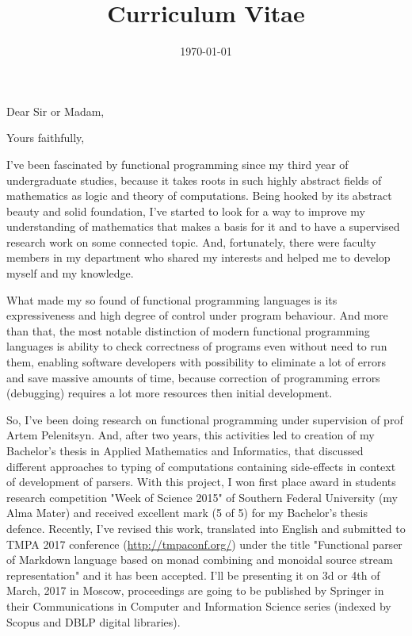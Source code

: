 \documentclass[11pt,a4paper,sans]{moderncv} %
\title{Curriculum Vitae}
\begin{document}


\clearpage

\date{\today} %
\opening{Dear Sir or Madam,} %
\closing{Yours faithfully,} %

\makelettertitle %

\justify
I've been fascinated by functional programming since my third year of
undergraduate studies, because it takes roots in such highly
abstract fields of mathematics as logic and theory of computations. Being hooked 
by its abstract beauty and solid foundation,
I've started to look for a way to improve my understanding of mathematics that 
makes a basis for it and to have a supervised research work on some connected 
topic. And, fortunately, there were faculty members in my department who shared 
my interests and helped me to develop myself and my knowledge.

What made my so found of functional programming languages is its expressiveness
and high degree of control under program behaviour. And more than that,
the most notable distinction of modern functional programming languages is
ability to check correctness of programs even without need to run them,
enabling software developers with possibility to eliminate a lot of errors and
save massive amounts of time, because correction of programming errors
(debugging) requires a lot more resources then initial development.

So, I've been doing research on functional programming under supervision of
prof Artem Pelenitsyn. And, after two years, this activities led to creation of
my Bachelor's thesis in Applied Mathematics and Informatics, that discussed
different approaches to typing of
computations containing side-effects in context of development of parsers. 
With this project, I won first place award in students research competition
"Week of Science 2015" of Southern Federal University (my Alma Mater) and
received excellent mark (5 of 5) for my Bachelor's thesis defence. 
Recently, I've revised this work, translated into English and submitted to 
TMPA 2017 conference (\url{http://tmpaconf.org/}) under the title "Functional 
parser of Markdown language based on monad combining and monoidal source stream 
representation" and it has been accepted. I'll be presenting it on 3d or 4th of
March, 2017 in Moscow, proceedings are going to be published by Springer in
their Communications in Computer and Information Science series (indexed by 
Scopus and DBLP digital libraries). 
\end{document}
